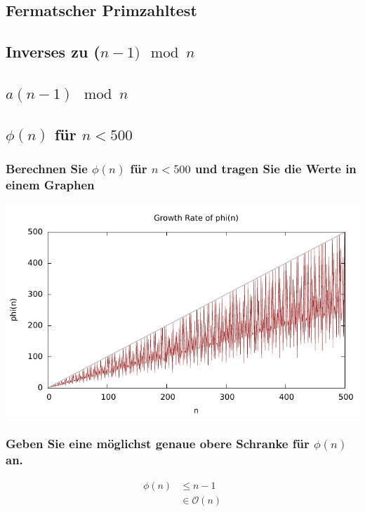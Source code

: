 \subsection{Fermatscher Primzahltest}
\subsection{Inverses zu ($n-1) \mod n$}
\subsection{$a(n-1) \mod n$}
\subsection{$\phi(n)$ für $n < 500$}

\subsubsection{Berechnen Sie $\phi(n)$ für $n < 500$ und tragen Sie die Werte in einem Graphen}

\includegraphics[scale=1]{eclipse/growth-rate.pdf}

\subsubsection{Geben Sie eine möglichst genaue obere Schranke für $\phi(n)$ an.}

\begin{align}
	 \phi(n) &\le n-1 \\
	 & \in \mathcal{O}(n)
\end{align}	
